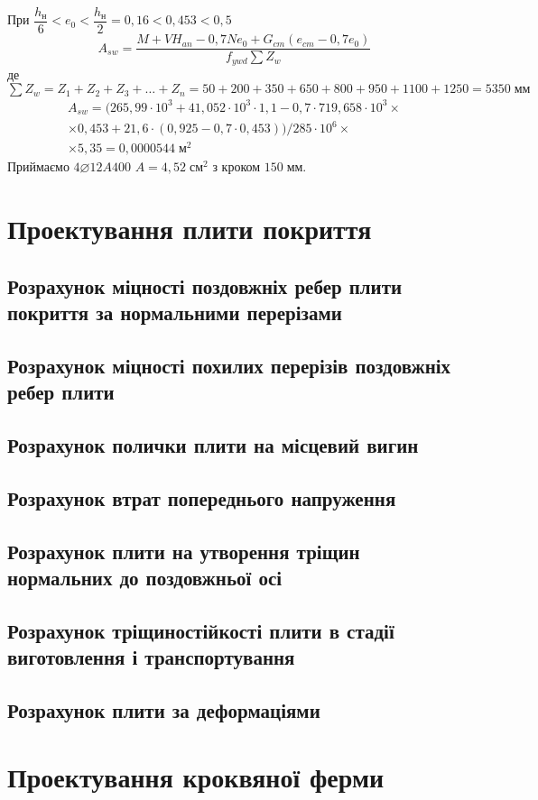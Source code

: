 \documentclass[a4paper,14pt]{article}
\begin{document}
\begin{enumerate}
    При $\dfrac{h_{\textit{н}}}{6} < e_0 < \dfrac{h_{\textit{н}}}{2} = 0,16 < 0,453 < 0,5$
        \begin{equation}
            A_{sw} = \dfrac{M + VH_{an} - 0,7Ne_0 + G_{cm}(e_{cm} - 0,7e_0)}{f_{ywd} \sum Z_w}
        \end{equation}
        де $\sum Z_w = Z_1 + Z_2 + Z_3 + \ldots + Z_n = 50 + 200 + 350 + 650 + 800 + 950 + 1100 + 1250 = 5350\;\textit{мм}$
        \begin{multline*}
        A_{sw} = (265,99 \cdot 10^3 + 41,052 \cdot 10^3 \cdot 1,1 - 0,7 \cdot 719,658 \cdot 10^3 \times\\\times 0,453 + 21,6 \cdot (0,925 - 0,7 \cdot 0,453))/285 \cdot 10^6 \times\\\times 5,35 = 0,0000544\;\textit{м}^2
        \end{multline*}
        Приймаємо $4\varnothing12A400$ $A = 4,52\;\textit{см}^2$ з кроком $150\;\textit{мм}$.
\end{enumerate} %

\newpage
\section{Проектування плити покриття}
\subsection{Розрахунок міцності поздовжніх ребер плити покриття за нормальними перерізами}
\subsection{Розрахунок міцності похилих перерізів поздовжніх ребер плити}
\subsection{Розрахунок полички плити на місцевий вигин}
\subsection{Розрахунок втрат попереднього напруження}
\subsection{Розрахунок плити на утворення тріщин нормальних до поздовжньої осі}
\subsection{Розрахунок тріщиностійкості плити в стадії виготовлення і транспортування}
\subsection{Розрахунок плити за деформаціями}

\newpage
\section{Проектування кроквяної ферми}
\end{document}
